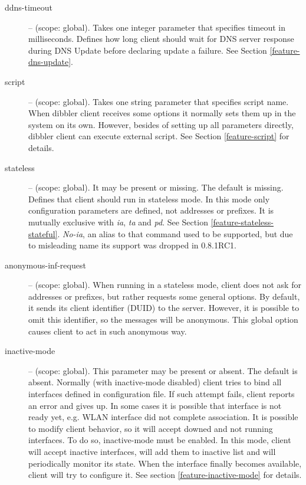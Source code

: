 \begin{description}
\item[ddns-timeout] -- (scope: global). Takes one integer parameter
that specifies timeout in milliseconds. Defines how long client should
wait for DNS server response during DNS Update before declaring
update a failure. See Section \ref{feature-dns-update}.

\item[script] -- (scope: global). Takes one string parameter that
  specifies script name. When dibbler client receives some options it normally
  sets them up in the system on its own. However, besides of setting up all
  parameters directly, dibbler client can execute external
  script. See Section \ref{feature-script} for details.

\item[stateless] -- (scope: global). It may be present or missing. The
  default is missing. Defines that client should run in stateless
  mode. In this mode only configuration parameters are defined, not
  addresses or prefixes. It is mutually exclusive
  with \emph{ia}, \emph{ta} and \emph{pd}. See
  Section \ref{feature-stateless-stateful}. \emph{No-ia}, an alias to that
  command used to be supported, but due to misleading name its support
  was dropped in 0.8.1RC1.


\item[anonymous-inf-request] -- (scope: global). When running in a
  stateless mode, client does not ask for addresses or prefixes, but
  rather requests some general options. By default, it sends its
  client identifier (DUID) to the server. However, it is possible to
  omit this identifier, so the  messages will be
  anonymous. This global option causes client to act in such anonymous
  way.

 \item[inactive-mode] -- (scope: global). This parameter may be
   present or absent. The default is absent. Normally (with
   inactive-mode disabled) client tries to bind all interfaces defined
   in configuration file. If such attempt fails, client reports an
   error and gives up. In some cases it is possible that interface is
   not ready yet, e.g. WLAN interface did not complete association. It
   is possible to modify client behavior, so it will accept downed and
   not running interfaces. To do so, inactive-mode must be enabled. In
   this mode, client will accept inactive interfaces, will add them to
   inactive list and will periodically monitor its state. When the
   interface finally becomes available, client will try to configure
   it. See section \ref{feature-inactive-mode} for details.


\end{description}

